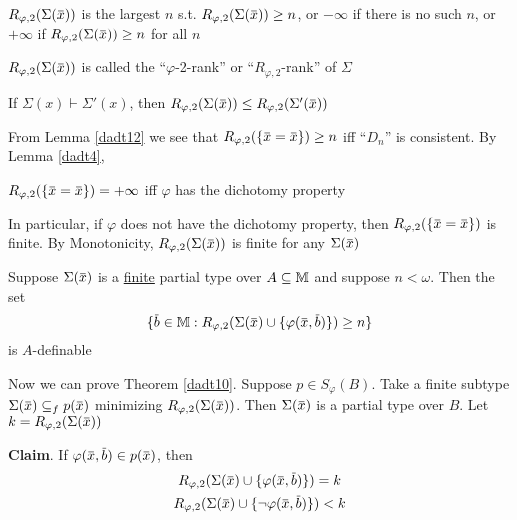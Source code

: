 \documentclass[11pt]{article}
\begin{document}
\begin{definition}[]
\(R_{\varphi,2}(\Sigma(\barx))\) is the largest \(n\) s.t. \(R_{\varphi,2}(\Sigma(\barx))\ge n\), or \(-\infty\) if there is
no such \(n\), or \(+\infty\) if \(R_{\varphi,2}(\Sigma(\barx))\ge n\) for all \(n\)
\end{definition}

\(R_{\varphi,2}(\Sigma(\barx))\) is called the ``\(\varphi\)-2-rank'' or ``\(R_{\varphi,2}\)-rank'' of \(\Sigma\)

\begin{remark}[Monotonicity]
If \(\Sigma(x)\vdash\Sigma'(x)\), then \(R_{\varphi,2}(\Sigma(\barx))\le R_{\varphi,2}(\Sigma'(\barx))\)
\end{remark}

\begin{remark}
From Lemma \ref{dadt12} we see that \(R_{\varphi,2}(\{\barx=\barx\})\ge n\) iff ``\(D_n\)'' is consistent. By
Lemma \ref{dadt4},
\begin{center}
\(R_{\varphi,2}(\{\barx=\barx\})=+\infty\) iff \(\varphi\) has the dichotomy property
\end{center}
In particular, if \(\varphi\) does not have the dichotomy property, then \(R_{\varphi,2}(\{\barx=\barx\})\) is
finite. By Monotonicity, \(R_{\varphi,2}(\Sigma(\barx))\) is finite for any \(\Sigma(\barx)\)
\end{remark}

\begin{remark}[Definability]
Suppose \(\Sigma(\barx)\) is a \uline{finite} partial type over \(A\subseteq\mathbb{M}\) and suppose \(n<\omega\). Then the set
\begin{equation*}
\{\barb\in\M:R_{\varphi,2}(\Sigma(\barx)\cup\{\varphi(\barx,\barb)\})\ge n\}
\end{equation*}
is \(A\)-definable
\end{remark}

Now we can prove Theorem \ref{dadt10}. Suppose \(p\in S_\varphi(B)\). Take a finite
subtype \(\Sigma(\barx)\subseteq_fp(\barx)\) minimizing \(R_{\varphi,2}(\Sigma(\barx))\). Then \(\Sigma(\barx)\) is a partial
type over \(B\). Let \(k=R_{\varphi,2}(\Sigma(\barx))\)

\textbf{Claim}. If \(\varphi(\barx,\barb)\in p(\barx)\), then
\begin{gather*}
R_{\varphi,2}(\Sigma(\barx)\cup\{\varphi(\barx,\barb)\})=k\\
R_{\varphi,2}(\Sigma(\barx)\cup\{\neg\varphi(\barx,\barb)\})<k
\end{gather*}
\end{document}
